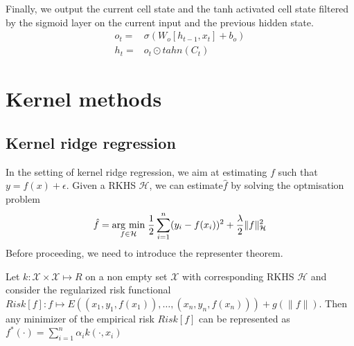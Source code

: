 Finally, we output the current cell state and the tanh activated cell state filtered by the sigmoid layer on the current input and the previous hidden state.
\begin{equation}
    \begin{aligned}
    o_t=& \sigma(W_o[h_{t-1},x_t]+b_o)
    \\
    h_t=& o_t \odot tahn(C_t)
\end{aligned}
\end{equation}


\section{Kernel methods}
\subsection{Kernel ridge regression}
In the setting of kernel ridge regression, we aim at estimating $f$ such that $y=f(x)+\epsilon$. Given a RKHS $\mathcal{H}$, we can estimate$\hat{f}$ by solving the optmisation problem
\begin{equation}\label{eq:kernel ridge}
    \hat{f}=\underset{f\in \mathcal{H}}{\operatorname{arg}\,\operatorname{min}}\;\frac{1}{2}\sum\limits_{i=1}^n(y_i-f(x_i))^2+\frac{\lambda}{2}\|f\|_{\mathcal{H}}^2
\end{equation}
Before proceeding, we need to introduce the representer theorem.
\begin{theorem}
    Let $k:\mathcal{X} \times \mathcal{X} \mapsto R$ on a non empty set $\mathcal{X}$ with corresponding RKHS $\mathcal{H}$ and consider the regularized risk functional $Risk[f]:f \mapsto  E\left((x_{1},y_{1},f(x_{1})),\ldots ,(x_{n},y_{n},f(x_{n}))\right)+g\left(\| f\| \right)$. Then any minimizer of the empirical risk $Risk[f]$ can be represented as $ f^{*}(\cdot )=\sum\limits_{i=1}^{n}\alpha _{i}k(\cdot ,x_{i})$
\end{theorem}

